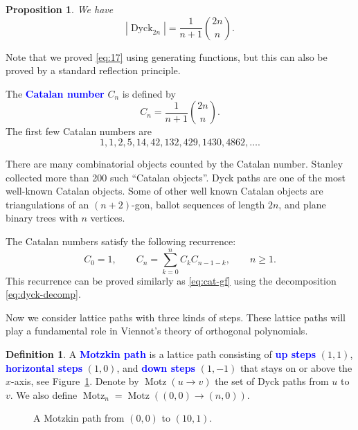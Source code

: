 \documentclass[oneside]{book}
\numberwithin{equation}{section}
\newtheorem{prop}[thm]{Proposition}
\theoremstyle{definition}
\newtheorem{defn}[thm]{Definition}
\newcommand\Motz{\operatorname{Motz}}
\newcommand{\Dyck}{\operatorname{Dyck}}
\renewcommand\emph[1]{\textcolor{blue}{\bf #1}}
\begin{document}
\begin{prop}
  We have
  \begin{equation}\label{eq:17}
    |\Dyck_{2n}| = \frac{1}{n+1} \binom{2n}{n}.
  \end{equation}
\end{prop}
Note that we proved \eqref{eq:17} using generating functions, but this
can also be proved by a standard reflection principle.

The \emph{Catalan number} \( C_n \) is defined by
\[
  C_n = \frac{1}{n+1} \binom{2n}{n}.
\]
The first few Catalan numbers are
\[
  1, 1, 2, 5, 14, 42, 132, 429, 1430, 4862, \ldots.
\]

There are many combinatorial objects counted by the Catalan number.
Stanley \cite{Stanley2015} collected more than 200 such ``Catalan
objects''. Dyck paths are one of the most well-known Catalan objects.
Some of other well known Catalan objects are triangulations of an
\( (n+2) \)-gon, ballot sequences of length \( 2n \), and plane binary
trees with \( n \) vertices.

The Catalan numbers satisfy the following recurrence:
\begin{equation}\label{eq:cat-rec}
  C_0 = 1, \qquad
  C_n = \sum_{k=0}^{n} C_k C_{n-1-k}, \qquad n\ge1.
\end{equation}
This recurrence can be proved similarly as \eqref{eq:cat-gf} using the
decomposition \eqref{eq:dyck-decomp}.


Now we consider lattice paths with three kinds of steps. These lattice
paths will play a fundamental role in Viennot's theory of orthogonal
polynomials.

\begin{defn}
  A \emph{Motzkin path} is a lattice path consisting of \emph{up
    steps} \( (1,1) \), \emph{horizontal steps} \( (1,0) \), and
  \emph{down steps} \( (1,-1) \) that stays on or above the
  \( x \)-axis, see Figure~\ref{fig:motzkin}. Denote by
  \( \Motz(u\to v) \) the set of Dyck paths from \( u \) to \( v \).
  We also define \( \Motz_{n} = \Motz((0,0)\to (n,0))\).
\end{defn}

\begin{figure}
  \centering
{}
\caption{A Motzkin path from \( (0,0) \) to \( (10,1) \).}
  \label{fig:motzkin}
\end{figure}
\end{document}
